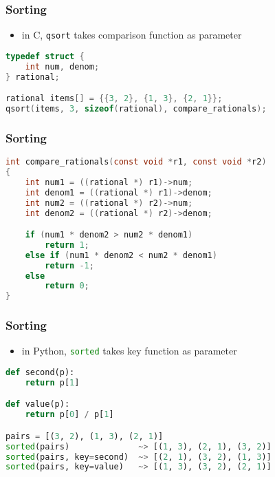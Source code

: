 \documentclass[dvipsnames]{beamer}
\theoremstyle{plain}
\begin{document}
\begin{frame}[fragile]
  \frametitle{Sorting}


  \begin{exampleblock}{}
    \begin{itemize}
      \item in C, \lstinline[language=c]{qsort} takes comparison function
        as parameter
    \end{itemize}

    \begin{lstlisting}[language=c]
typedef struct {
    int num, denom;
} rational;

rational items[] = {{3, 2}, {1, 3}, {2, 1}};
qsort(items, 3, sizeof(rational), compare_rationals);
    \end{lstlisting}
  \end{exampleblock}
\end{frame}

\begin{frame}[fragile]
  \frametitle{Sorting}

  \begin{exampleblock}{}
    \begin{lstlisting}[language=c]
int compare_rationals(const void *r1, const void *r2)
{
    int num1 = ((rational *) r1)->num;
    int denom1 = ((rational *) r1)->denom;
    int num2 = ((rational *) r2)->num;
    int denom2 = ((rational *) r2)->denom;

    if (num1 * denom2 > num2 * denom1)
        return 1;
    else if (num1 * denom2 < num2 * denom1)
        return -1;
    else
        return 0;
}
    \end{lstlisting}
  \end{exampleblock}
\end{frame}

\begin{frame}[fragile]
  \frametitle{Sorting}

  \begin{exampleblock}{}
    \begin{itemize}
      \item in Python, \lstinline[language=python]{sorted} takes key function
        as parameter
    \end{itemize}

    \begin{lstlisting}[language=python]
def second(p):
    return p[1]

def value(p):
    return p[0] / p[1]

pairs = [(3, 2), (1, 3), (2, 1)]
sorted(pairs)              ~> [(1, 3), (2, 1), (3, 2)]
sorted(pairs, key=second)  ~> [(2, 1), (3, 2), (1, 3)]
sorted(pairs, key=value)   ~> [(1, 3), (3, 2), (2, 1)]
    \end{lstlisting}
  \end{exampleblock}
\end{frame}
\end{document}
